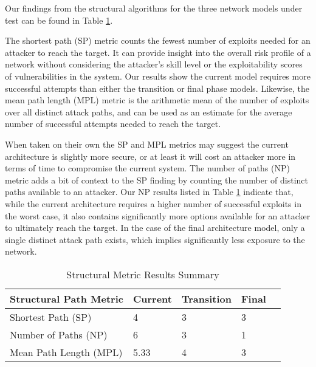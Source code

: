 Our findings from the structural algorithms for the three network models under test can be found in Table \ref{tab:sp_results}. 

The shortest path (SP) metric counts the fewest number of exploits needed for an attacker to reach the target. It can provide insight into the overall risk profile of a network without considering the attacker's skill level or the exploitability scores of vulnerabilities in the system. Our results show the current model requires more successful attempts than either the transition or final phase models. Likewise, the mean path length (MPL) metric is the arithmetic mean of the number of exploits over all distinct attack paths, and can be used as an estimate for the average number of successful attempts needed to reach the target. 

When taken on their own the SP and MPL metrics may suggest the current architecture is slightly more secure, or at least it will cost an attacker more in terms of time to compromise the current system. The number of paths (NP) metric adds a bit of context to the SP finding by counting the number of distinct paths available to an attacker. Our NP results listed in Table \ref{tab:sp_results} indicate that, while the current architecture requires a higher number of successful exploits in the worst case, it also contains significantly more options available for an attacker to ultimately reach the target. In the case of the final architecture model, only a single distinct attack path exists, which implies significantly less exposure to the network.





\begin{table}[ht]
\caption{Structural Metric Results Summary}
\begin{tabular}{@{}lllll@{}}
\toprule
Structural Path Metric & Current & Transition & Final &  \\ \midrule
Shortest Path (SP) & 4 & 3 & 3 &  \\
Number of Paths (NP) & 6 & 3 & 1 &  \\
Mean Path Length (MPL) & 5.33 & 4 & 3 &  \\ \bottomrule
\end{tabular}
\label{tab:sp_results}
\end{table}